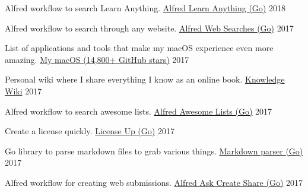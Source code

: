 
\begin{cventries}

  \cventry
    {Alfred workflow to search Learn Anything.}
    {\href{https://github.com/nikitavoloboev/alfred-learn-anything}{Alfred Learn Anything (Go)}}
    {}
    {2018}
    {
    }

    \cventry
    {Alfred workflow to search through any website.}
    {\href{https://github.com/nikitavoloboev/alfred-web-searches}{Alfred Web Searches (Go)}}
    {}
    {2017}
    {
    }

    \cventry
    {List of applications and tools that make my macOS experience even more amazing.}
    {\href{https://github.com/nikitavoloboev/my-mac-os}{My macOS (14,800+ GitHub stars)}}
    {}
    {2017}
    {
    }

    \cventry
    {Personal wiki where I share everything I know as an online book.}
    {\href{https://wiki.nikitavoloboev.xyz}{Knowledge Wiki}}
    {}
    {2017}
    {
    }

    \cventry
    {Alfred workflow to search awesome lists.}
    {\href{https://github.com/nikitavoloboev/alfred-awesome-lists}{Alfred Awesome Lists (Go)}}
    {}
    {2017}
    {
    }

    \cventry
    {Create a license quickly.}
    {\href{https://github.com/nikitavoloboev/license-up}{License Up (Go)}}
    {}
    {2017}
    {
    }

    \cventry
    {Go library to parse markdown files to grab various things.}
    {\href{https://github.com/nikitavoloboev/markdown-parser}{Markdown parser (Go)}}
    {}
    {2017}
    {
    }

    \cventry
    {Alfred workflow for creating web submissions.}
    {\href{https://github.com/nikitavoloboev/alfred-ask-create-share}{Alfred Ask Create Share (Go)}}
    {}
    {2017}
    {
    }

\end{cventries}
